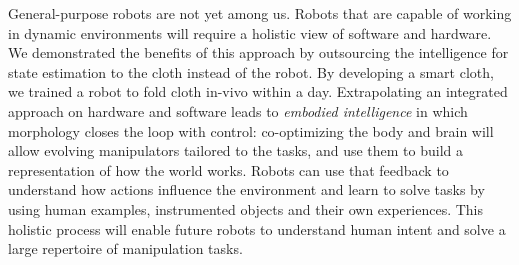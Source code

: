 \documentclass[\home/main.tex]{subfiles}
\begin{document}
General-purpose robots are not yet among us. Robots that are capable of working in dynamic environments will require a holistic view of software and hardware. 
We demonstrated the benefits of this approach by outsourcing the intelligence for state estimation to the cloth instead of the robot. By developing a smart cloth, we trained a robot to fold cloth in-vivo within a day.  
Extrapolating an integrated approach on hardware and software leads to \emph{embodied intelligence} in which morphology closes the loop with control: co-optimizing the body and brain will allow evolving manipulators tailored to
the tasks, and use them to build a representation of how the world works. 
Robots can use that feedback to understand how actions influence the environment and learn to solve tasks by using human examples, instrumented objects and their own experiences.
This holistic process will enable future robots to understand human intent and solve a large repertoire of manipulation tasks. 




\glsresetall
\end{document}
